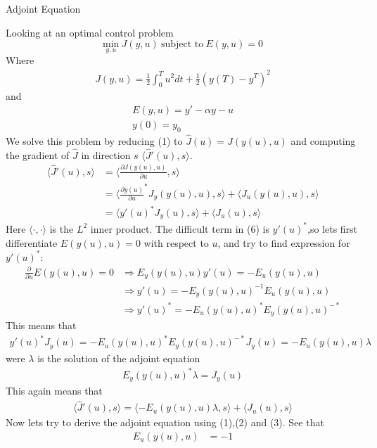 \documentclass[11pt,a4paper]{report}
\begin{document}
\begin{center}

\LARGE Adjoint Equation


\end{center}
Looking at an optimal control problem $$\underset{y,u}{\text{min}} \ J(y,u) \ \text{subject to} \ E(y,u)=0$$ Where 
\begin{gather}
J(y,u) = \frac{1}{2}\int_0^Tu^2dt + \frac{1}{2}(y(T)-y^T)^2
\end{gather} 
and 
\begin{gather}
    E(y,u) = y'-\alpha y -u \\ 
    y(0)=y_0
\end{gather}
We solve this problem by reducing (1) to $\hat{J}(u) = J(y(u),u) $ and computing the gradient of $\hat{J}$ in direction $s$ $\langle\hat{J}'(u),s\rangle$. \begin{align}    
\langle\hat{J}'(u),s\rangle &= \langle\frac{\partial J(y(u),u)}{\partial u},s\rangle \\ &= \langle \frac{\partial y(u)}{\partial u}^*J_y(y(u),u),s\rangle + \langle J_u(y(u),u),s\rangle \\ &= \langle y'(u)^*J_y(u),s\rangle +\langle J_u(u),s\rangle
\end{align}
Here $\langle\cdot,\cdot\rangle$ is the $L^2$ inner product. The difficult term in (6) is $y'(u)^*$,so lets first differentiate $E(y(u),u)=0$ with respect to $u$, and try to find expression for $y'(u)^*$: 
\begin{align}
\frac{\partial}{\partial u}E(y(u),u)=0 &\Rightarrow E_y(y(u),u)y'(u)=-E_u(y(u),u) \\ &\Rightarrow y'(u)=-E_y(y(u),u)^{-1}E_u(y(u),u) \\ &\Rightarrow y'(u)^* = -E_u(y(u),u)^*E_y(y(u),u)^{-*}
\end{align} 
This means that 
\begin{gather}
y'(u)^*J_y(u)=-E_u(y(u),u)^*E_y(y(u),u)^{-*}J_y(u)=-E_u(y(u),u)\lambda
\end{gather}
were $\lambda$ is the solution of the adjoint equation 
\begin{gather}
E_y(y(u),u)^{*}\lambda=J_y(u)
\end{gather}
This again means that 
\begin{gather}
\langle\hat{J}'(u),s\rangle=\langle -E_u(y(u),u)\lambda,s\rangle +\langle J_u(u),s\rangle
\end{gather} 
Now lets try to derive the adjoint equation using (1),(2) and (3). See that 
\begin{align}
E_u(y(u),u)&=-1 
\end{align}
\end{document}

